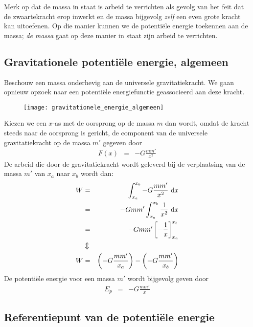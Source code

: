 Merk op dat de massa in staat is arbeid te verrichten als gevolg van het feit dat de zwaartekracht erop inwerkt en de massa bijgevolg \textit{zelf} een even grote kracht kan uitoefenen. Op die manier kunnen we de potenti\"ele energie toekennen aan de massa; \textit{de massa} gaat op deze manier in staat zijn arbeid te verrichten.

\subsection{Gravitationele potenti\"ele energie, algemeen}\label{gravitationele potentiele energie alg}

Beschouw een massa onderhevig aan de universele gravitatiekracht. We gaan opnieuw opzoek naar een potenti\"ele energiefunctie geassocieerd aan deze kracht.
\begin{figure}[h]
\begin{center}
\texttt{[image: gravitationele\_energie\_algemeen]}
\end{center}
\end{figure}

Kiezen we een $x$-as met de oorsprong op de massa $m$ dan wordt, omdat de kracht steeds naar de oorsprong is gericht, de component van de universele gravitatiekracht op de massa $m'$ gegeven door
\begin{eqnarray*}
F(x)&=&-G\frac{mm'}{x^2}
\end{eqnarray*}
De arbeid die door de gravitatiekracht wordt geleverd bij de verplaatsing van de massa $m'$ van $x_a$ naar $x_b$ wordt dan:
\begin{eqnarray*}
W&=&\int_{x_a}^{x_b}-G\frac{mm'}{x^2}~{\rm d}x\\
&=&-Gmm'\int_{x_a}^{x_b}\frac{1}{x^2}~{\rm d}x\\
&=&-Gmm'\left[-\frac{1}{x}\right]_{x_a}^{x_b}\\
&\Updownarrow&\\
W&=&\left(-G\frac{mm'}{x_a}\right)-\left(-G\frac{mm'}{x_b}\right)
\end{eqnarray*}
De potenti\"ele energie voor een massa $m'$ wordt bijgevolg geven
door
\begin{eqnarray}
E_p&=&-G\frac{mm'}{x}\label{Ep=-Gmm'/x}
\end{eqnarray}

\subsection{Referentiepunt van de potenti\"ele energie}


